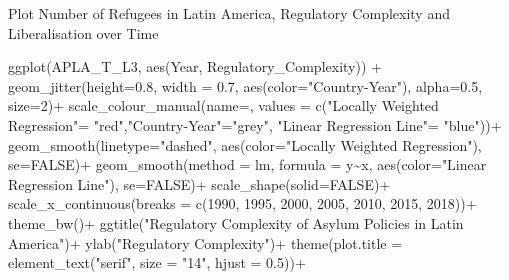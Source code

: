 \documentclass[
  ignorenonframetext,
]{beamer}
\newenvironment{Shaded}{\begin{snugshade}}{\end{snugshade}}
\newcommand{\AttributeTok}[1]{\textcolor[rgb]{0.77,0.63,0.00}{#1}}
\newcommand{\ConstantTok}[1]{\textcolor[rgb]{0.00,0.00,0.00}{#1}}
\newcommand{\DecValTok}[1]{\textcolor[rgb]{0.00,0.00,0.81}{#1}}
\newcommand{\FloatTok}[1]{\textcolor[rgb]{0.00,0.00,0.81}{#1}}
\newcommand{\FunctionTok}[1]{\textcolor[rgb]{0.00,0.00,0.00}{#1}}
\newcommand{\NormalTok}[1]{#1}
\newcommand{\OtherTok}[1]{\textcolor[rgb]{0.56,0.35,0.01}{#1}}
\newcommand{\SpecialCharTok}[1]{\textcolor[rgb]{0.00,0.00,0.00}{#1}}
\newcommand{\StringTok}[1]{\textcolor[rgb]{0.31,0.60,0.02}{#1}}
\begin{document}
\begin{frame}[fragile]{Plot Number of Refugees in Latin America,
Regulatory Complexity and Liberalisation over Time}
\begin{Shaded}
\begin{Highlighting}[]
\FunctionTok{ggplot}\NormalTok{(APLA\_T\_L3, }\FunctionTok{aes}\NormalTok{(Year, Regulatory\_Complexity)) }\SpecialCharTok{+}
  \FunctionTok{geom\_jitter}\NormalTok{(}\AttributeTok{height=}\FloatTok{0.8}\NormalTok{, }\AttributeTok{width =} \FloatTok{0.7}\NormalTok{, }\FunctionTok{aes}\NormalTok{(}\AttributeTok{color=}\StringTok{"Country{-}Year"}\NormalTok{), }\AttributeTok{alpha=}\FloatTok{0.5}\NormalTok{, }\AttributeTok{size=}\DecValTok{2}\NormalTok{)}\SpecialCharTok{+}
  \FunctionTok{scale\_colour\_manual}\NormalTok{(}\AttributeTok{name=}\StringTok{\textquotesingle{}\textquotesingle{}}\NormalTok{, }\AttributeTok{values =} \FunctionTok{c}\NormalTok{(}\StringTok{"Locally Weighted Regression"}\OtherTok{=} \StringTok{"red"}\NormalTok{,}\StringTok{"Country{-}Year"}\OtherTok{=}\StringTok{"grey"}\NormalTok{, }\StringTok{"Linear Regression Line"}\OtherTok{=} \StringTok{"blue"}\NormalTok{))}\SpecialCharTok{+}
  \FunctionTok{geom\_smooth}\NormalTok{(}\AttributeTok{linetype=}\StringTok{"dashed"}\NormalTok{, }\FunctionTok{aes}\NormalTok{(}\AttributeTok{color=}\StringTok{"Locally Weighted Regression"}\NormalTok{), }\AttributeTok{se=}\ConstantTok{FALSE}\NormalTok{)}\SpecialCharTok{+}
  \FunctionTok{geom\_smooth}\NormalTok{(}\AttributeTok{method =} \StringTok{\textquotesingle{}lm\textquotesingle{}}\NormalTok{, }\AttributeTok{formula =}\NormalTok{ y}\SpecialCharTok{\textasciitilde{}}\NormalTok{x, }\FunctionTok{aes}\NormalTok{(}\AttributeTok{color=}\StringTok{"Linear Regression Line"}\NormalTok{), }\AttributeTok{se=}\ConstantTok{FALSE}\NormalTok{)}\SpecialCharTok{+}
  \FunctionTok{scale\_shape}\NormalTok{(}\AttributeTok{solid=}\ConstantTok{FALSE}\NormalTok{)}\SpecialCharTok{+}
  \FunctionTok{scale\_x\_continuous}\NormalTok{(}\AttributeTok{breaks =} \FunctionTok{c}\NormalTok{(}\DecValTok{1990}\NormalTok{, }\DecValTok{1995}\NormalTok{, }\DecValTok{2000}\NormalTok{, }\DecValTok{2005}\NormalTok{, }\DecValTok{2010}\NormalTok{, }\DecValTok{2015}\NormalTok{, }\DecValTok{2018}\NormalTok{))}\SpecialCharTok{+}
  \FunctionTok{theme\_bw}\NormalTok{()}\SpecialCharTok{+}
  \FunctionTok{ggtitle}\NormalTok{(}\StringTok{"Regulatory Complexity of Asylum Policies in Latin America"}\NormalTok{)}\SpecialCharTok{+}
  \FunctionTok{ylab}\NormalTok{(}\StringTok{"Regulatory Complexity"}\NormalTok{)}\SpecialCharTok{+}
  \FunctionTok{theme}\NormalTok{(}\AttributeTok{plot.title =} \FunctionTok{element\_text}\NormalTok{(}\StringTok{"serif"}\NormalTok{, }\AttributeTok{size =} \StringTok{"14"}\NormalTok{, }\AttributeTok{hjust =} \FloatTok{0.5}\NormalTok{))}\SpecialCharTok{+}

\end{Highlighting}
\end{Shaded}
\end{frame}
\end{document}
